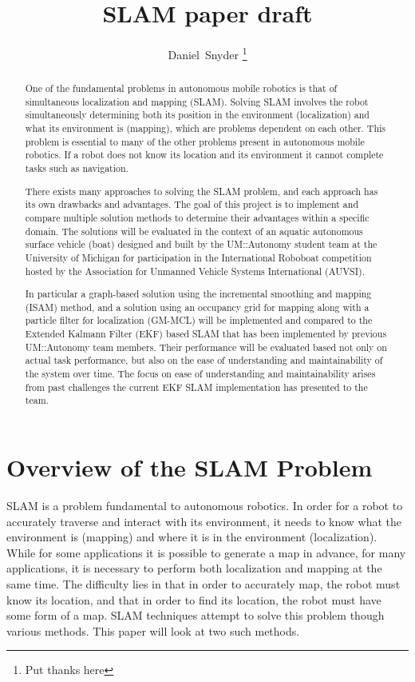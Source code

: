 \documentclass[10pt]{IEEEtran}
\begin{document}
\title{SLAM paper draft}
\author{Daniel~Snyder
\thanks{Put thanks here}
}
\maketitle
\begin{abstract}
One of the fundamental problems in autonomous mobile robotics is that of simultaneous
localization and mapping (SLAM).  Solving SLAM involves the robot simultaneously
determining both its position in the environment (localization) and what its environment
is (mapping), which are problems dependent on each other.  This problem is essential to
many of the other problems present in autonomous mobile robotics.  If a robot does not
know its location and its environment it cannot complete tasks such as navigation.  
 
There exists many approaches to solving the SLAM problem, and each approach has
its own drawbacks and advantages.  The goal of this project is to implement and
compare multiple solution methods to determine their advantages within a specific
domain.  The solutions will be evaluated in the context of an aquatic autonomous surface
vehicle (boat) designed and built by the UM::Autonomy student team at the University
of Michigan for participation in the International Roboboat competition hosted by
the Association for Unmanned Vehicle Systems International (AUVSI).   
  
In particular a graph-based solution using the incremental smoothing and mapping
(ISAM) method, and a solution using an occupancy grid for mapping along with a 
particle filter for localization (GM-MCL) will be implemented and compared
to the Extended Kalmann Filter (EKF) based SLAM that has been implemented by previous
UM::Autonomy team members.  Their performance will be evaluated based not only on
actual task performance, but also on the ease of understanding and maintainability
of the system over time.  The focus on ease of understanding and maintainability
arises from past challenges the current EKF SLAM implementation has presented to the team. 
\end{abstract}

\section{Overview of the SLAM Problem}
SLAM is a problem fundamental to autonomous robotics.  In order for a robot to accurately
traverse and interact with its environment, it needs to know what the environment is 
(mapping) and where it is in the environment (localization).  While for some applications it
is possible to generate a map in advance, for many applications, it is necessary to perform 
both localization and mapping at the same time.  The difficulty lies in that in order to 
accurately map, the robot must know its location, and that in order to find its location, the
robot must have some form of a map.  SLAM techniques attempt to solve this problem though 
various methods.  This paper will look at two such methods.
\end{document}
